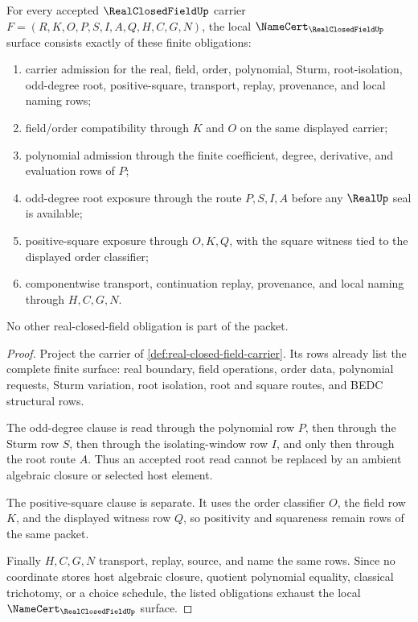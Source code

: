 \begin{theorem}
\label{thm:real-closed-field-namecert-obligations}
For every accepted $\RealClosedFieldUp$ carrier $F=(R,K,O,P,S,I,A,Q,H,C,G,N)$, the local $\NameCert_{\RealClosedFieldUp}$ surface consists exactly of these finite obligations:
\begin{enumerate}
\item carrier admission for the real, field, order, polynomial, Sturm, root-isolation, odd-degree root, positive-square, transport, replay, provenance, and local naming rows;
\item field/order compatibility through $K$ and $O$ on the same displayed carrier;
\item polynomial admission through the finite coefficient, degree, derivative, and evaluation rows of $P$;
\item odd-degree root exposure through the route $P,S,I,A$ before any $\RealUp$ seal is available;
\item positive-square exposure through $O,K,Q$, with the square witness tied to the displayed order classifier;
\item componentwise transport, continuation replay, provenance, and local naming through $H,C,G,N$.
\end{enumerate}
No other real-closed-field obligation is part of the packet.
\end{theorem}
\begin{proof}
Project the carrier of \autoref{def:real-closed-field-carrier}. Its rows already list the complete finite surface: real boundary, field operations, order data, polynomial requests, Sturm variation, root isolation, root and square routes, and BEDC structural rows.

The odd-degree clause is read through the polynomial row $P$, then through the Sturm row $S$, then through the isolating-window row $I$, and only then through the root route $A$. Thus an accepted root read cannot be replaced by an ambient algebraic closure or selected host element.

The positive-square clause is separate. It uses the order classifier $O$, the field row $K$, and the displayed witness row $Q$, so positivity and squareness remain rows of the same packet.

Finally $H,C,G,N$ transport, replay, source, and name the same rows. Since no coordinate stores host algebraic closure, quotient polynomial equality, classical trichotomy, or a choice schedule, the listed obligations exhaust the local $\NameCert_{\RealClosedFieldUp}$ surface.
\end{proof}

